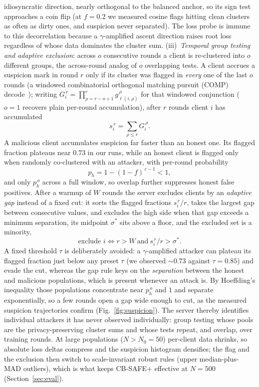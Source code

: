 \documentclass[lettersize,journal]{IEEEtran}
\begin{document}
idiosyncratic direction, nearly orthogonal to the balanced anchor, so its sign test
approaches a coin flip (at $f{=}0.2$ we measured cosine flags hitting clean clusters
as often as dirty ones, and suspicion never separated). The loss probe is immune to
this decorrelation because a $\gamma$-amplified ascent direction raises root loss
regardless of whose data dominates the cluster sum. (iii)~\emph{Temporal group
testing and adaptive exclusion}: across $o$ consecutive rounds a client is
re-clustered into $o$ different groups, the across-round analog of $o$ overlapping
tests. A client accrues a suspicion mark in round $r$ only if its cluster was flagged
in \emph{every} one of the last $o$ rounds (a windowed combinatorial orthogonal
matching pursuit (COMP) decode~\cite{comp}); writing
$G_i^{\,r}=\prod_{\rho=r-o+1}^{r} g_{\ell(i,\rho)}^{\,\rho}$ for that windowed
conjunction ($o{=}1$ recovers plain per-round accumulation), after $r$ rounds client
$i$ has accumulated
\begin{equation}\label{eq:susp}
s_i^{\,r} = \sum_{\rho\le r} G_i^{\,\rho}.
\end{equation}
A malicious client accumulates suspicion far faster than an honest one. Its flagged
fraction plateaus near $0.73$ in our runs, while an honest client is flagged only when
randomly co-clustered with an attacker, with per-round probability
\begin{equation}\label{eq:ph}
p_h = 1-(1-f)^{\,c-1} < 1 ,
\end{equation}
and only $p_h^{\,o}$ across a full window, so overlap further suppresses honest false
positives. After a warmup of $W$ rounds the server excludes clients by an
\emph{adaptive gap} instead of a fixed cut: it sorts the flagged fractions
$s_i^{\,r}/r$, takes the largest gap between consecutive values, and excludes the high
side when that gap exceeds a minimum separation, its midpoint $\sigma^{*}$ sits above a
floor, and the excluded set is a minority,
\begin{equation}\label{eq:excl}
\text{exclude } i \iff r>W \ \text{and}\ s_i^{\,r}/r > \sigma^{*} .
\end{equation}
A fixed threshold $\tau$ is deliberately avoided: a $\gamma$-amplified attacker can
plateau its flagged fraction just below any preset $\tau$ (we observed $\sim$0.73
against $\tau{=}0.85$) and evade the cut, whereas the gap rule keys on the
\emph{separation} between the honest and malicious populations, which is present
whenever an attack is. By Hoeffding's inequality those populations concentrate near
$p_h^{\,o}$ and $1$ and separate exponentially, so a few rounds open a gap wide enough
to cut, as the measured suspicion trajectories confirm (Fig.~\ref{fig:suspicion}).
The server thereby identifies individual attackers it has never observed
individually: group testing \cite{dorfman1943,aldridge2019} whose pools are the
privacy-preserving cluster sums and whose tests repeat, and overlap, over training
rounds. At large populations ($N>N_0{=}50$) per-client data shrinks, so absolute loss
deltas compress and the suspicion histogram densifies; the flag and the exclusion then
switch to scale-invariant robust rules (upper median-plus-MAD outliers), which is what
keeps CB-SAFE+ effective at $N{=}500$ (Section~\ref{sec:eval}).
\end{document}
